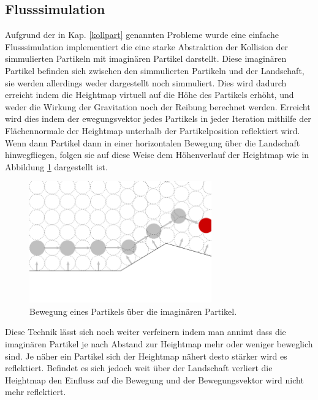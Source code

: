 \begin{Spacing}{\mylinespace}
	\subsection{Flusssimulation}
		Aufgrund der in Kap. \ref{kollpart} genannten Probleme wurde eine
		einfache Flusssimulation implementiert die eine starke Abstraktion
		der Kollision der simmulierten Partikeln mit imaginären Partikel darstellt.
		Diese imaginären Partikel befinden sich zwischen den simmulierten
		Partikeln und der Landschaft, sie werden allerdings weder dargestellt
		noch simmuliert. Dies wird dadurch erreicht indem die Heightmap virtuell
		auf die Höhe des Partikels erhöht, und weder die Wirkung der Gravitation
		noch der Reibung berechnet werden. Erreicht wird dies indem der 
		ewegungsvektor jedes Partikels in jeder Iteration mithilfe der
		Flächennormale der Heightmap unterhalb der Partikelposition
		reflektiert wird.
		Wenn dann Partikel dann in einer horizontalen Bewegung über die 
		Landschaft hinwegfliegen, folgen sie auf diese Weise dem Höhenverlauf
		der Heightmap wie in Abbildung \ref{fig:flow1} dargestellt ist.
		\begin{figure}[h!]
			\centering
			\vspace*{30px}
			\includegraphics[width=0.7\textwidth]{graphics/Phys_flow1.png}
			\caption{ Bewegung eines Partikels über die imaginären Partikel. }
			\label{fig:flow1}
		\end{figure}
		Diese Technik lässt sich noch weiter verfeinern indem man annimt dass
		die imaginären Partikel je nach Abstand zur Heightmap mehr oder weniger
		beweglich sind. Je näher ein Partikel sich der Heightmap nähert desto
		stärker wird es reflektiert. Befindet es sich jedoch weit über der
		Landschaft verliert die Heightmap den Einfluss auf die Bewegung und der
		Bewegungsvektor wird nicht mehr reflektiert.
		\begin{figure}[h!]
			\centering
			\vspace*{30px}

\end{figure}
\end{Spacing}
